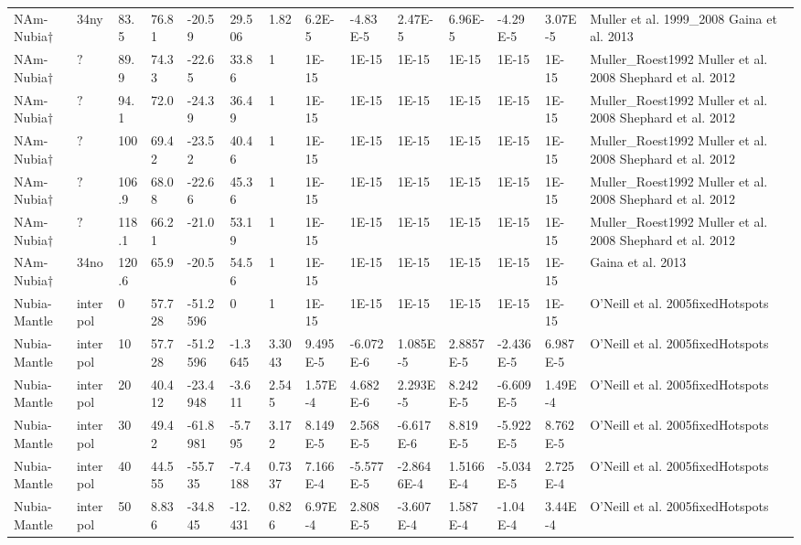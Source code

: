 \begin{landscape}
\begin{longtable}{@{}lllllllllllll>{\scriptsize}p{3.1cm}@{}}
NAm-Nubia$\dagger$ & 34ny & 83.5 & 76.81 & -20.59 & 29.506 & 1.82 & 6.2E-5 & -4.83E-5 & 2.47E-5 & 6.96E-5 & -4.29E-5 & 3.07E-5 & Muller et al. 1999\_2008 Gaina et al. 2013 \\
NAm-Nubia$\dagger$ & $\mathord{?}$ & 89.9 & 74.33 & -22.65 & 33.86 & 1 & 1E-15 & 1E-15 & 1E-15 & 1E-15 & 1E-15 & 1E-15 & Muller\_Roest1992 Muller et al. 2008 Shephard et al. 2012 \\
NAm-Nubia$\dagger$ & $\mathord{?}$ & 94.1 & 72.0 & -24.39 & 36.49 & 1 & 1E-15 & 1E-15 & 1E-15 & 1E-15 & 1E-15 & 1E-15 & Muller\_Roest1992 Muller et al. 2008 Shephard et al. 2012 \\
NAm-Nubia$\dagger$ & $\mathord{?}$ & 100 & 69.42 & -23.52 & 40.46 & 1 & 1E-15 & 1E-15 & 1E-15 & 1E-15 & 1E-15 & 1E-15 & Muller\_Roest1992 Muller et al. 2008 Shephard et al. 2012 \\
NAm-Nubia$\dagger$ & $\mathord{?}$ & 106.9 & 68.08 & -22.66 & 45.36 & 1 & 1E-15 & 1E-15 & 1E-15 & 1E-15 & 1E-15 & 1E-15 & Muller\_Roest1992 Muller et al. 2008 Shephard et al. 2012 \\
NAm-Nubia$\dagger$ & $\mathord{?}$ & 118.1 & 66.21 & -21.0 & 53.19 & 1 & 1E-15 & 1E-15 & 1E-15 & 1E-15 & 1E-15 & 1E-15 & Muller\_Roest1992 Muller et al. 2008 Shephard et al. 2012 \\
NAm-Nubia$\dagger$ & 34no & 120.6 & 65.9 & -20.5 & 54.56 & 1 & 1E-15 & 1E-15 & 1E-15 & 1E-15 & 1E-15 & 1E-15 & Gaina et al. 2013 \\
Nubia-Mantle & interpol & 0 & 57.728 & -51.2596 & 0 & 1 & 1E-15 & 1E-15 & 1E-15 & 1E-15 & 1E-15 & 1E-15 & O'Neill et al. 2005fixedHotspots \\
Nubia-Mantle & interpol & 10 & 57.728 & -51.2596 & -1.3645 & 3.3043 & 9.495E-5 & -6.072E-6 & 1.085E-5 & 2.8857E-5 & -2.436E-5 & 6.987E-5 & O'Neill et al. 2005fixedHotspots \\
Nubia-Mantle & interpol & 20 & 40.412 & -23.4948 & -3.611 & 2.545 & 1.57E-4 & 4.682E-6 & 2.293E-5 & 8.242E-5 & -6.609E-5 & 1.49E-4 & O'Neill et al. 2005fixedHotspots \\
Nubia-Mantle & interpol & 30 & 49.42 & -61.8981 & -5.795 & 3.172 & 8.149E-5 & 2.568E-5 & -6.617E-6 & 8.819E-5 & -5.922E-5 & 8.762E-5 & O'Neill et al. 2005fixedHotspots \\
Nubia-Mantle & interpol & 40 & 44.555 & -55.735 & -7.4188 & 0.7337 & 7.166E-4 & -5.577E-5 & -2.8646E-4 & 1.5166E-4 & -5.034E-5 & 2.725E-4 & O'Neill et al. 2005fixedHotspots \\
Nubia-Mantle & interpol & 50 & 8.836 & -34.845 & -12.431 & 0.826 & 6.97E-4 & 2.808E-5 & -3.607E-4 & 1.587E-4 & -1.04E-4 & 3.44E-4 & O'Neill et al. 2005fixedHotspots \\

\end{longtable}
\end{landscape}
